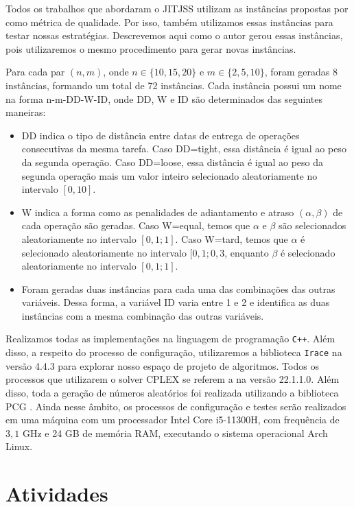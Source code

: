 Todos os trabalhos que abordaram o \ac{JITJSS} utilizam as instâncias propostas por \cite{baptiste2008lagrangian} como métrica de qualidade. Por isso, também utilizamos essas instâncias para testar nossas estratégias. Descrevemos aqui como o autor gerou essas instâncias, pois utilizaremos o mesmo procedimento para gerar novas instâncias.

Para cada par $(n,m)$, onde $n \in \{10, 15, 20\}$ e $m \in \{2, 5,10\}$, foram geradas 8 instâncias, formando um total de 72 instâncias. Cada instância possui um nome na forma n-m-DD-W-ID, onde DD, W e ID são determinados das seguintes maneiras:

\begin{itemize}
  \item DD indica o tipo de distância entre datas de entrega de operações consecutivas da mesma tarefa. Caso DD=tight, essa distância é igual ao peso da segunda operação. Caso DD=loose, essa distância é igual ao peso da segunda operação mais um valor inteiro selecionado aleatoriamente no intervalo $[0,10]$.
  \item W indica a forma como as penalidades de adiantamento e atraso $(\alpha, \beta)$ de cada operação são geradas. Caso W=equal, temos que $\alpha$ e $\beta$ são selecionados aleatoriamente no intervalo $[0,1; 1]$. Caso W=tard, temos que $\alpha$ é selecionado aleatoriamente no intervalo $[0,1;0,3$, enquanto $\beta$ é selecionado aleatoriamente no intervalo $[0,1;1]$.  
  \item Foram geradas duas instâncias para cada uma das combinações das outras variáveis. Dessa forma, a variável ID varia entre 1 e 2 e identifica as duas instâncias com a mesma combinação das outras variáveis.
\end{itemize}

Realizamos todas as implementações na linguagem de programação \texttt{C++}. Além disso, a respeito do processo de configuração, utilizaremos a biblioteca \texttt{Irace} \citep{lopez2016irace} na versão 4.4.3 para explorar nosso espaço de projeto de algoritmos. Todos os processos que utilizarem o solver CPLEX se referem a \cite{cplex22} na versão 22.1.1.0. Além disso, toda a geração de números aleatórios foi realizada utilizando a biblioteca PCG \citep{oneill:pcg2014}. Ainda nesse âmbito, os processos de configuração e testes serão realizados em uma máquina com um processador Intel Core i5-11300H, com frequência de $3,1$ GHz e 24 GB de memória RAM, executando o sistema operacional Arch Linux.

\section{Atividades}

